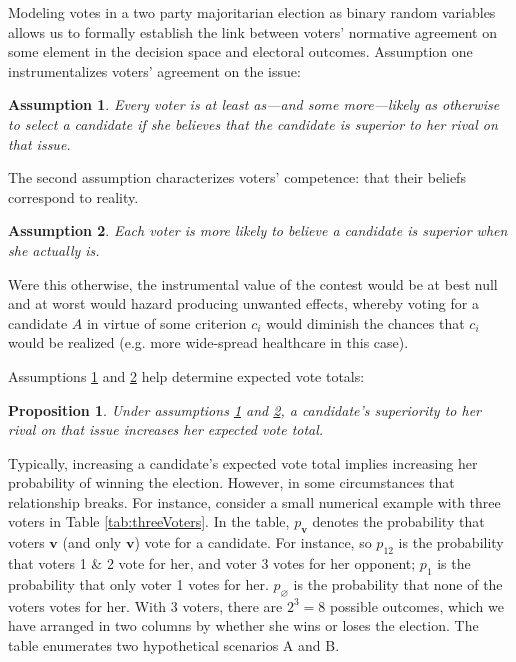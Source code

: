\documentclass[11pt]{article}
\newtheorem{prop}{Proposition}
\newtheorem{ass}{Assumption}
\begin{document}
Modeling votes in a two party majoritarian election as
binary random variables allows us to formally establish the link between voters' normative agreement on some element in the decision space and electoral outcomes.
Assumption one instrumentalizes voters' agreement on the issue:
\begin{ass}\label{ass:preference}
Every voter is at least as---and some more---likely as otherwise to select a candidate if she believes  that the candidate is superior to her rival on that issue.
\end{ass}
The second assumption characterizes voters' competence: that their beliefs correspond to reality.
\begin{ass}\label{ass:belief}%
Each voter is more likely to believe a candidate is
          superior when she actually is.
\end{ass}
Were this otherwise, the instrumental value of the contest would be at best null and at worst would hazard producing unwanted effects, whereby voting for a candidate $A$ in virtue of some criterion $c_i$ would diminish the chances that $c_i$ would be realized (e.g. more wide-spread healthcare in this case).

Assumptions \ref{ass:preference} and \ref{ass:belief} help determine expected vote totals:
\begin{prop}\label{prop:voteTotal}
Under assumptions \ref{ass:preference} and \ref{ass:belief},
a candidate's superiority to her rival on that issue increases her expected vote total.
\end{prop}

Typically, increasing a candidate's expected vote total implies
increasing her probability of winning the election.
However, in some circumstances that relationship breaks.
For instance, consider a small numerical example with three voters in
Table \ref{tab:threeVoters}. 
In the table, $p_{\bm{v}}$ denotes the probability that voters
$\bm{v}$ (and only $\bm{v}$) vote for a candidate.
For instance, so $p_{12}$ is the probability that
voters 1 \& 2 vote for her, and voter 3 votes for her opponent; $p_1$
is the probability that only voter 1 votes for her.
$p_\varnothing$ is the probability that none of the voters votes for
her. 
With 3 voters, there are $2^3=8$ possible outcomes, which we have
arranged in two columns by whether she wins or loses the election.
The table enumerates two hypothetical scenarios A and B. 
\end{document}
